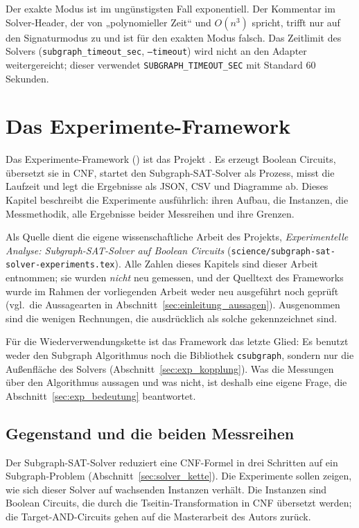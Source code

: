 Der exakte Modus ist im ungünstigsten Fall exponentiell. Der Kommentar im Solver-Header, der von „polynomieller Zeit“ und $O(n^3)$ spricht, trifft nur auf den Signaturmodus zu und ist für den exakten Modus falsch. Das Zeitlimit des Solvers (\texttt{subgraph\_timeout\_sec}, \texttt{--timeout}) wird nicht an den Adapter weitergereicht; dieser verwendet \texttt{SUBGRAPH\_TIMEOUT\_SEC} mit Standard $60$ Sekunden.

\chapter{Das Experimente-Framework}
\label{chap:experimente}

Das Experimente-Framework () ist das Projekt . Es erzeugt Boolean Circuits, übersetzt sie in CNF, startet den Subgraph-SAT-Solver als Prozess, misst die Laufzeit und legt die Ergebnisse als JSON, CSV und Diagramme ab. Dieses Kapitel beschreibt die Experimente ausführlich: ihren Aufbau, die Instanzen, die Messmethodik, alle Ergebnisse beider Messreihen und ihre Grenzen.

Als Quelle dient die eigene wissenschaftliche Arbeit des Projekts, \emph{Experimentelle Analyse: Subgraph-SAT-Solver auf Boolean Circuits} (\texttt{science/subgraph-sat-solver-experiments.tex}). Alle Zahlen dieses Kapitels sind dieser Arbeit entnommen; sie wurden \emph{nicht} neu gemessen, und der Quelltext des Frameworks wurde im Rahmen der vorliegenden Arbeit weder neu ausgeführt noch geprüft (vgl.\ die Aussagearten in Abschnitt~\ref{sec:einleitung_aussagen}). Ausgenommen sind die wenigen Rechnungen, die ausdrücklich als solche gekennzeichnet sind.

Für die Wiederverwendungskette ist das Framework das letzte Glied: Es benutzt weder den Subgraph Algorithmus noch die Bibliothek \texttt{csubgraph}, sondern nur die Außenfläche des Solvers (Abschnitt~\ref{sec:exp_kopplung}). Was die Messungen über den Algorithmus aussagen und was nicht, ist deshalb eine eigene Frage, die Abschnitt~\ref{sec:exp_bedeutung} beantwortet.

\section{Gegenstand und die beiden Messreihen}
\label{sec:exp_gegenstand}

Der Subgraph-SAT-Solver reduziert eine CNF-Formel in drei Schritten auf ein Subgraph-Problem (Abschnitt~\ref{sec:solver_kette}). Die Experimente sollen zeigen, wie sich dieser Solver auf wachsenden Instanzen verhält. Die Instanzen sind Boolean Circuits, die durch die Tseitin-Transformation \cite{tseitin1968} in CNF übersetzt werden; die Target-AND-Circuits gehen auf die Masterarbeit des Autors \cite{epp2013} zurück.

